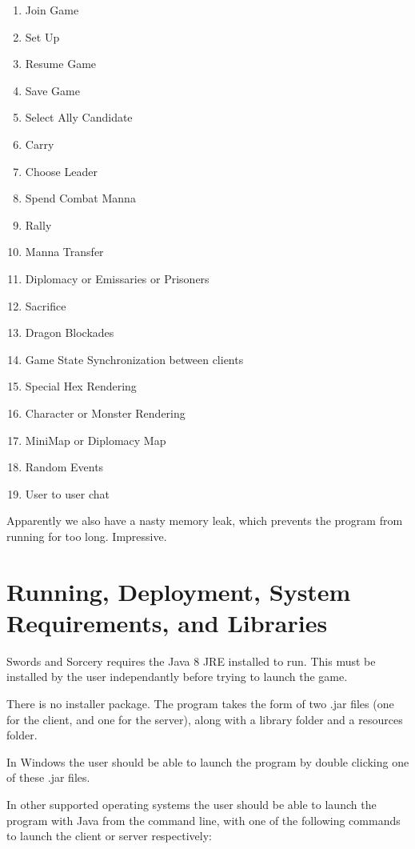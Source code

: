 \documentclass[12pt,a4paper]{article}
\begin{document}
\begin{enumerate}
\item{Join Game}
\item{Set Up}
\item{Resume Game}
\item{Save Game}
\item{Select Ally Candidate}
\item{Carry}
\item{Choose Leader}
\item{Spend Combat Manna}
\item{Rally}
\item{Manna Transfer}
\item{Diplomacy or Emissaries or Prisoners}
\item{Sacrifice}
\item{Dragon Blockades}
\item{Game State Synchronization between clients}
\item{Special Hex Rendering}
\item{Character or Monster Rendering}
\item{MiniMap or Diplomacy Map}
\item{Random Events}
\item{User to user chat}
\end{enumerate}

Apparently we also have a nasty memory leak, which prevents the program
from running for too long. Impressive.

\section{Running, Deployment, System Requirements, and Libraries}
Swords and Sorcery requires the Java 8 JRE installed to run. This must be 
installed by the user independantly before trying to launch the game.

There is no installer package. The program takes the form of two .jar files
(one for the client, and one for the server), along with a library folder and a 
resources folder.

In Windows the user should be
able to launch the program by double clicking one of these .jar files. 

In other supported operating systems the user should be able to launch the
program with Java from the command line, with one of the following commands to
launch the client or server respectively:
\end{document}
